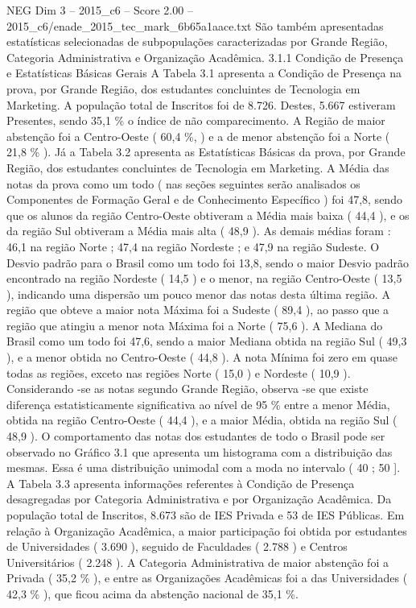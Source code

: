 \begin{textsample}{NEG Dim 3 – 2015\_c6 – Score 2.00 – 2015\_c6/enade\_2015\_tec\_mark\_6b65a1aace.txt}
São também apresentadas estatísticas selecionadas de subpopulações caracterizadas por Grande Região, Categoria Administrativa e Organização Acadêmica. 3.1.1 Condição de Presença e Estatísticas Básicas Gerais A Tabela 3.1 apresenta a Condição de Presença na prova, por Grande Região, dos estudantes concluintes de Tecnologia em Marketing.
A população total de Inscritos foi de 8.726.
Destes, 5.667 estiveram Presentes, sendo 35,1 \% o índice de não comparecimento.
A Região de maior abstenção foi a Centro-Oeste ( 60,4 \%, ) e a de menor abstenção foi a Norte ( 21,8 \% ).
Já a Tabela 3.2 apresenta as Estatísticas Básicas da prova, por Grande Região, dos estudantes concluintes de Tecnologia em Marketing.
A Média das notas da prova como um todo ( nas seções seguintes serão analisados os Componentes de Formação Geral e de Conhecimento Específico ) foi 47,8, sendo que os alunos da região Centro-Oeste obtiveram a Média mais baixa ( 44,4 ), e os da região Sul obtiveram a Média mais alta ( 48,9 ).
As demais médias foram : 46,1 na região Norte ; 47,4 na região Nordeste ; e 47,9 na região Sudeste.
O Desvio padrão para o Brasil como um todo foi 13,8, sendo o maior Desvio padrão encontrado na região Nordeste ( 14,5 ) e o menor, na região Centro-Oeste ( 13,5 ), indicando uma dispersão um pouco menor das notas desta última região.
A região que obteve a maior nota Máxima foi a Sudeste ( 89,4 ), ao passo que a região que atingiu a menor nota Máxima foi a Norte ( 75,6 ).
A Mediana do Brasil como um todo foi 47,6, sendo a maior Mediana obtida na região Sul ( 49,3 ), e a menor obtida no Centro-Oeste ( 44,8 ).
A nota Mínima foi zero em quase todas as regiões, exceto nas regiões Norte ( 15,0 ) e Nordeste ( 10,9 ).
Considerando -se as notas segundo Grande Região, observa -se que existe diferença estatisticamente significativa ao nível de 95 \% entre a menor Média, obtida na região Centro-Oeste ( 44,4 ), e a maior Média, obtida na região Sul ( 48,9 ).
O comportamento das notas dos estudantes de todo o Brasil pode ser observado no Gráfico 3.1 que apresenta um histograma com a distribuição das mesmas.
Essa é uma distribuição unimodal com a moda no intervalo ( 40 ; 50 ].
A Tabela 3.3 apresenta informações referentes à Condição de Presença desagregadas por Categoria Administrativa e por Organização Acadêmica.
Da população total de Inscritos, 8.673 são de IES Privada e 53 de IES Públicas.
Em relação à Organização Acadêmica, a maior participação foi obtida por estudantes de Universidades ( 3.690 ), seguido de Faculdades ( 2.788 ) e Centros Universitários ( 2.248 ).
A Categoria Administrativa de maior abstenção foi a Privada ( 35,2 \% ), e entre as Organizações Acadêmicas foi a das Universidades ( 42,3 \% ), que ficou acima da abstenção nacional de 35,1 \%.

\end{textsample}
